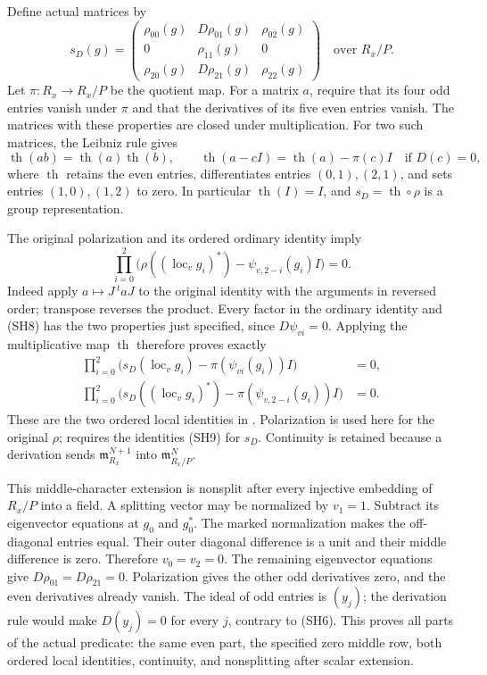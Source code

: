 Define actual matrices by
\[
 s_D(g)=
 \begin{pmatrix}
 \rho_{00}(g)&D\rho_{01}(g)&\rho_{02}(g)\\
 0&\rho_{11}(g)&0\\
 \rho_{20}(g)&D\rho_{21}(g)&\rho_{22}(g)
 \end{pmatrix}
                    \quad\text{over }R_x/P .                 \tag{SH7}
\]
Let \(\pi:R_x\to R_x/P\) be the quotient map.
For a matrix \(a\), require that its four odd
entries vanish under \(\pi\) and that the
derivatives of its five even entries vanish.
The matrices with these properties are closed
under multiplication.
For two such matrices, the Leibniz rule gives
\[
 \operatorname{th}(ab)
       =\operatorname{th}(a)\operatorname{th}(b),
 \qquad
 \operatorname{th}(a-cI)
       =\operatorname{th}(a)-\pi(c)I
                          \quad\text{if }D(c)=0,
\]
where \(\operatorname{th}\) retains the even
entries, differentiates entries \((0,1),(2,1)\),
and sets entries \((1,0),(1,2)\) to zero.
In particular \(\operatorname{th}(I)=I\), and
\(s_D=\operatorname{th}\circ\rho\) is a group
representation.

The original polarization and its ordered
ordinary identity imply
\[
 \prod_{i=0}^{2}
   \bigl(\rho((\operatorname{loc}_v g_i)^*)
                    -\psi_{v,2-i}(g_i)I\bigr)=0.             \tag{SH8}
\]
Indeed apply \(a\mapsto J\,{}^taJ\) to the original
identity with the arguments in reversed order;
transpose reverses the product.
Every factor in the ordinary identity and
(SH8) has the two properties just specified,
since \(D\psi_{vi}=0\).
Applying the multiplicative map
\(\operatorname{th}\) therefore proves exactly
\[
 \begin{split}
 \prod_{i=0}^{2}
   \bigl(s_D(\operatorname{loc}_v g_i)
                    -\pi(\psi_{vi}(g_i))I\bigr)&=0,\\
 \prod_{i=0}^{2}
   \bigl(s_D((\operatorname{loc}_v g_i)^*)
                    -\pi(\psi_{v,2-i}(g_i))I\bigr)&=0.
 \end{split}                                                \tag{SH9}
\]
These are the two ordered local identities in
.
Polarization is used here for the original
\(\rho\);  requires the
identities (SH9) for \(s_D\).
Continuity is retained because a
derivation sends
\(\mathfrak m_{R_x}^{N+1}\) into
\(\mathfrak m_{R_x/P}^N\).

This middle-character extension is
nonsplit after every injective embedding
of \(R_x/P\) into a field.
A splitting vector may be normalized
by \(v_1=1\).
Subtract its eigenvector equations
at \(g_0\) and \(g_0^*\).
The marked normalization makes the
off-diagonal entries equal.
Their outer diagonal difference is
a unit and their middle difference
is zero.
Therefore \(v_0=v_2=0\).
The remaining eigenvector equations
give
\(D\rho_{01}=D\rho_{21}=0\).
Polarization gives the other odd
derivatives zero, and the even
derivatives already vanish.
The ideal of odd entries is
\((y_j)\); the derivation rule would
make \(D(y_j)=0\) for every \(j\),
contrary to (SH6).
This proves all parts of the actual
 predicate:
the same even part, the specified
zero middle row, both ordered local
identities, continuity, and
nonsplitting after scalar extension.


